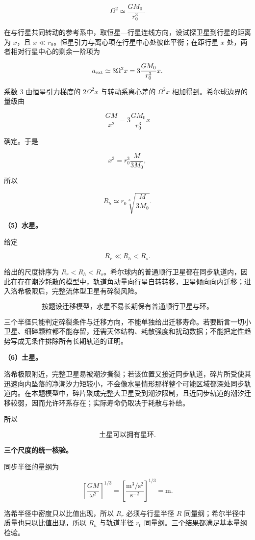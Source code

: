 \documentclass[12pt,a4paper,UTF8]{ctexart}
\begin{document}
\[\Omega^2\simeq\frac{GM_0}{r_0^3}.\]

在与行星共同转动的参考系中，取恒星---行星连线方向，设试探卫星到行星的距离为
\(x\)，且 \(x\ll r_0\)。恒星引力与离心项在行星中心处彼此平衡；在距行星
\(x\) 处，两者相对行星中心的剩余一阶项为

\[a_{\rm ext}\simeq3\Omega^2x
=3\frac{GM_0}{r_0^3}x.\]

系数 \(3\) 由恒星引力梯度的 \(2\Omega^2x\) 与转动系离心差的
\(\Omega^2x\) 相加得到。希尔球边界的量级由

\[\frac{GM}{x^2}=3\frac{GM_0}{r_0^3}x\]

确定。于是

\[x^3=r_0^3\frac{M}{3M_0},\]

所以

\[\boxed{R_h\simeq r_0\sqrt[3]{\frac{M}{3M_0}}}.\]

\textbf{（5）水星。}

给定

\[R_r\ll R_h<R_s.\]

给出的尺度排序为
\(R_r<R_h<R_s\)。希尔球内的普通顺行卫星都在同步轨道内，因此在存在潮汐耗散的模型中，轨道角动量向行星自转转移，卫星倾向向内迁移；进入洛希极限后，完整流体型卫星有碎裂风险。

\[\boxed{\text{按题设迁移模型，水星不易长期保有普通顺行卫星与环。}}\]

三个半径只能判定碎裂条件与迁移方向，不能单独给出迁移寿命。若要断言一切小卫星、细碎颗粒都不能存留，还需天体结构、耗散强度和扰动数据；不能把定性趋势写成无条件排除所有长期轨道的证明。

\textbf{（6）土星。}

洛希极限附近，完整卫星易被潮汐撕裂；若该位置又接近同步轨道，碎片所受使其迅速向内坠落的净潮汐力矩较小，不会像水星情形那样整个可能区域都深处同步轨道内。在本题模型中，碎片聚成完整大卫星受到潮汐限制，且近同步轨道的潮汐迁移较弱，因而允许环系存在；实际寿命仍取决于耗散与补给。

所以

\[\boxed{\text{土星可以拥有星环}}.\]

\textbf{三个尺度的统一核验。}

同步半径的量纲为

\[\left[\frac{GM}{\omega^2}\right]^{1/3}
=\left[\frac{\mathrm{m^3/s^2}}{\mathrm{s^{-2}}}\right]^{1/3}
=\mathrm m.\]

洛希半径中密度只以比值出现，所以 \(R_r\) 必须与行星半径 \(R\)
同量纲；希尔半径中质量也只以比值出现，所以 \(R_h\) 与轨道半径 \(r_0\)
同量纲。三个结果都满足基本量纲检验。
\end{document}
